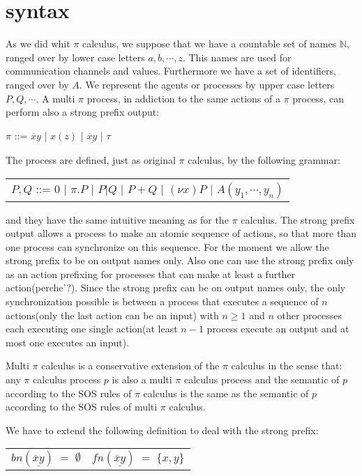 
\section{syntax}
As we did whit $\pi$ calculus, we suppose that we have a countable set of names $\mathbb{N}$, ranged over by lower case letters $a,b, \cdots, z$. This names are used for communication channels and values. Furthermore we have a set of identifiers, ranged over by $A$. We represent the agents or processes by upper case letters $P,Q, \cdots $. A multi $\pi$ process, in addiction to the same actions of a $\pi$ process, can perform also a strong prefix output:
\begin{center}
  $\pi$ ::= $\overline{x}y$ | $x(z)$ | $\underline{\overline{x}y}$ | $\tau$ 
\end{center}
The process are defined, just as original $\pi$ calculus, by the following grammar:
\begin{center}
  \begin{tabular}{l}
    $P,Q$ ::= $0$ | $\pi.P$ | $P|Q$ | $P+Q$ | $(\nu x) P$ | $A(y_{1}, \cdots, y_{n})$
  \end{tabular}
\end{center}
and they have the same intuitive meaning as for the $\pi$ calculus. The strong prefix output allows a process to make an atomic sequence of actions, so that more than one process can synchronize on this sequence. For the moment we allow the strong prefix to be on output names only. Also one can use the strong prefix only as an action prefixing for processes that can make at least a further action(perche'?). Since the strong prefix can be on output names only, the only synchronization possible is between a process that executes a sequence of $n$ actions(only the last action can be an input) with $n\geq 1$ and $n$ other processes each executing one single action(at least $n-1$ process execute an output and at most one executes an input).

Multi $\pi$ calculus is a conservative extension of the $\pi$ calculus in the sense that: any $\pi$ calculus process $p$ is also a multi $\pi$ calculus process and the semantic of $p$ according to the SOS rules of $\pi$ calculus is the same as the semantic of $p$ according to the SOS rules of multi $\pi$ calculus. 

We have to extend the following definition to deal with the strong prefix:
\begin{center}
  \begin{tabular}{ll}
	$bn(\underline{\overline{x}y})\; =\; \emptyset$
      &
	$fn(\underline{\overline{x}y})\; =\; \{x,y\}$
    \\
  \end{tabular}
\end{center}


